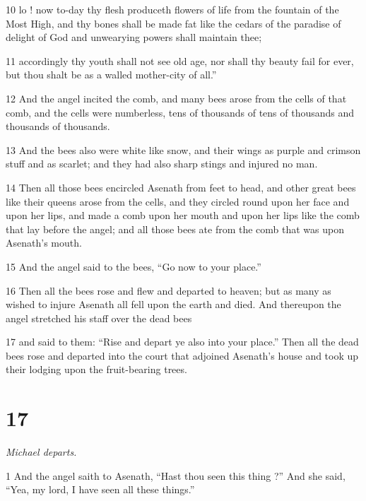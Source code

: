 \par 10 lo ! now to-day thy flesh produceth flowers of life from the fountain of the Most High, and thy bones shall be made fat like the cedars of the paradise of delight of God and unwearying powers shall maintain thee; 

\par 11 accordingly thy youth shall not see old age, nor shall thy beauty fail for ever, but thou shalt be as a walled mother-city of all.” 

\par 12 And the angel incited the comb, and many bees arose from the cells of that comb, and the cells were numberless, tens of thousands of tens of thousands and thousands of thousands. 

\par 13 And the bees also were white like snow, and their wings as purple and crimson stuff and as scarlet; and they had also sharp stings and injured no man. 

\par 14 Then all those bees encircled Asenath from feet to head, and other great bees like their queens arose from the cells, and they circled round upon her face and upon her lips, and made a comb upon her mouth and upon her lips like the comb that lay before the angel; and all those bees ate from the comb that was upon Asenath's mouth. 

\par 15 And the angel said to the bees, “Go now to your place.” 

\par 16 Then all the bees rose and flew and departed to heaven; but as many as wished to injure Asenath all fell upon the earth and died. And thereupon the angel stretched his staff over the dead bees 

\par 17 and said to them: “Rise and depart ye also into your place.” Then all the dead bees rose and departed into the court that adjoined Asenath's house and took up their lodging upon the fruit-bearing trees. 

\chapter{17}

\par \textit{Michael departs.}

\par 1 And the angel saith to Asenath, “Hast thou seen this thing ?” And she said, “Yea, my lord, I have seen all these things.” 


